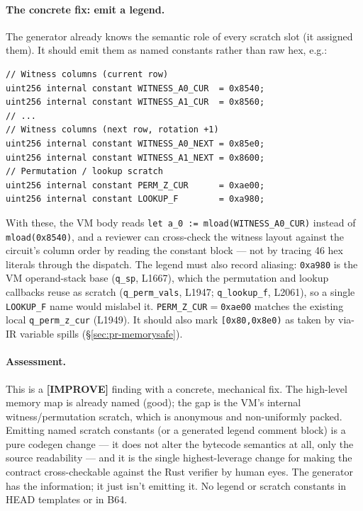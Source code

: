 \paragraph{The concrete fix: emit a legend.}
The generator already knows the semantic role of every scratch
slot (it assigned them). It should emit them as named constants
rather than raw hex, e.g.:
\begin{lstlisting}[style=plain]
// Witness columns (current row)
uint256 internal constant WITNESS_A0_CUR  = 0x8540;
uint256 internal constant WITNESS_A1_CUR  = 0x8560;
// ...
// Witness columns (next row, rotation +1)
uint256 internal constant WITNESS_A0_NEXT = 0x85e0;
uint256 internal constant WITNESS_A1_NEXT = 0x8600;
// Permutation / lookup scratch
uint256 internal constant PERM_Z_CUR      = 0xae00;
uint256 internal constant LOOKUP_F        = 0xa980;
\end{lstlisting}
With these, the VM body reads
\texttt{let a\_\allowbreak{}0 := mload(WITNESS\_\allowbreak{}A0\_\allowbreak{}CUR)} instead of
\texttt{mload(0x8540)}, and a reviewer can cross-check the
witness layout against the circuit's column order by reading the
constant block --- not by tracing 46 hex literals through the
dispatch. The legend must also record aliasing: \texttt{0xa980} is
the VM operand-stack base (\texttt{q\_sp}, L1667), which the
permutation and lookup callbacks reuse as scratch
(\texttt{q\_perm\_vals}, L1947; \texttt{q\_lookup\_f}, L2061), so a
single \texttt{LOOKUP\_F} name would mislabel it.
\texttt{PERM\_Z\_CUR}$=$\texttt{0xae00} matches the existing local
\texttt{q\_perm\_z\_cur} (L1949). It should also mark
\texttt{[0x80,0x8e0)} as taken by via-IR variable spills
(\S\ref{sec:pr-memorysafe}).

\paragraph{Assessment.} This is a
\textcolor{codegenblue}{\textbf{[IMPROVE]}} finding with a
concrete, mechanical fix. The high-level memory map is already
named (good); the gap is the VM's internal witness/permutation
scratch, which is anonymous and non-uniformly packed. Emitting
named scratch constants (or a generated legend comment block) is
a pure codegen change --- it does not alter the bytecode semantics
at all, only the source readability --- and it is the single
highest-leverage change for making the contract cross-checkable
against the Rust verifier by human eyes. The generator has the
information; it just isn't emitting it.  No legend
or scratch constants in HEAD templates or in B64.

